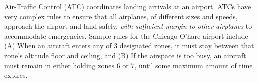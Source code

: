 
\begin{exmp}
\label{ex:ATC_example}
Air-Traffic Control (ATC) coordinates landing arrivals at an airport. 
ATCs have very complex rules to ensure that all airplanes, of different sizes and speeds, approach the airport and land safely, \textit{with sufficient margin to other airplanes} to accommodate emergencies.
Sample rules for the Chicago O'hare airport include 
(A) When an aircraft enters any of 3 designated zones, it must stay between that zone's altitude floor and ceiling, and 
(B)  If the airspace is too busy, an aircraft must remain in either holding zones $6$ or $7$, until some maximum amount of time expires.
\end{exmp}
